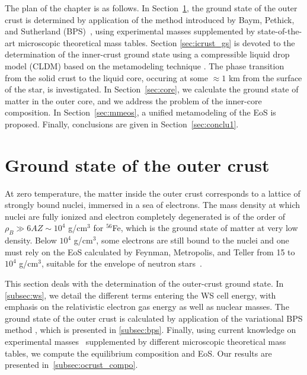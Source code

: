 The plan of the chapter is as follows. In Section~\ref{sec:ocrust_gs}, the 
ground state of the outer crust is determined by application of the 
method introduced by Baym, Pethick, and Sutherland (BPS)~\cite{BPS}, using 
experimental masses supplemented by 
state-of-the-art microscopic theoretical mass tables. 
Section \ref{sec:icrust_gs} is devoted to the determination of the inner-crust ground 
state using a compressible liquid drop model (CLDM) based on the metamodeling
technique \cite{Margueron2018a,Carreau2019cc}. The phase transition 
from the solid crust to the liquid core, occuring at some $\approx 1$ km from the 
surface of the star, is investigated. In Section~\ref{sec:core}, we calculate 
the ground state of matter in the outer core, and we address the problem of the 
inner-core composition. In Section~\ref{sec:mmeos}, a unified metamodeling of 
the EoS is proposed. Finally, conclusions are given in Section~\ref{sec:conclu1}.

\minitoc\newpage

\section{Ground state of the outer crust}\label{sec:ocrust_gs}

At zero temperature, the matter inside the outer crust corresponds to a 
lattice of strongly bound nuclei, immersed in a sea of electrons. The mass 
density at which nuclei are fully ionized and electron completely degenerated 
is of the order of $\rho_B \gg 6AZ \sim 10^4$ g/cm$^3$ for $^{56}$Fe, which is
the ground state of matter at very low density. Below $10^4$ g/cm$^3$, some 
electrons are still bound to the nuclei and one must rely on the EoS 
calculated by Feynman, Metropolis, and Teller from 15 to $10^4$ g/cm$^3$, 
suitable for the envelope of neutron stars~\cite{Feynman1949}.

This section deals with the determination of the outer-crust ground state. 
In \ref{subsec:ws}, we detail the different terms entering the WS cell 
energy, with emphasis on the relativistic electron gas energy as well as 
nuclear masses. The ground state of the outer crust is calculated by
application of the variational BPS method \cite{BPS}, which is 
presented in \ref{subsec:bps}. Finally, using current knowledge on experimental
masses~\cite{Huang2017} supplemented by different microscopic theoretical mass
tables, we compute the equilibrium composition and EoS. Our results are
presented in~\ref{subsec:ocrust_compo}.

